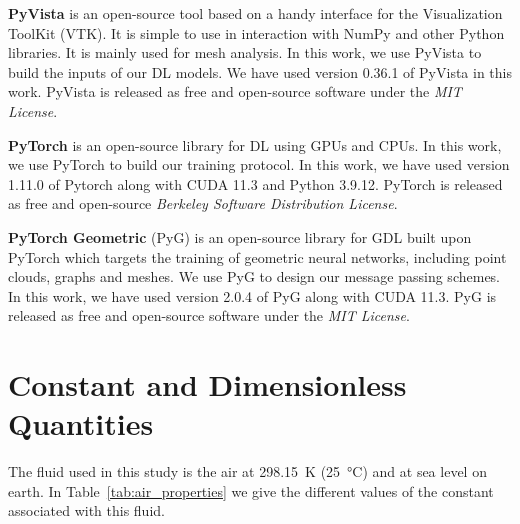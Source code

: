 \begin{subappendices}
	\textbf{PyVista} \cite{pyvista} is an open-source tool based on a handy interface for the Visualization ToolKit (VTK). It is simple to use in interaction with NumPy \cite{numpy} and other Python libraries. It is mainly used for mesh analysis. In this work, we use PyVista to build the inputs of our DL models. We have used version 0.36.1 of PyVista in this work. PyVista is released as free and open-source software under the \emph{MIT License}.
	
	\textbf{PyTorch} \cite{NEURIPS2019_9015} is an open-source library for DL using GPUs and CPUs. In this work, we use PyTorch to build our training protocol. In this work, we have used version 1.11.0 of Pytorch along with CUDA 11.3 and Python 3.9.12. PyTorch is released as free and open-source \emph{Berkeley Software Distribution License}.
	
	\textbf{PyTorch Geometric} (PyG) \cite{fey2019graph} is an open-source library for GDL built upon PyTorch which targets the training  of geometric neural networks, including point clouds, graphs and meshes. We use PyG to design our message passing schemes. In this work, we have used version 2.0.4 of PyG along with CUDA 11.3. PyG is released as free and open-source software under the \emph{MIT License}.
	
	\section{Constant and Dimensionless Quantities}\label{ap:dimensionless}
	The fluid used in this study is the air at \SI{298.15}{\kelvin} (\SI{25}{\celsius}) and at sea level on earth. In Table~\ref{tab:air_properties} we give the different values of the constant associated with this fluid.
	

\end{subappendices}
